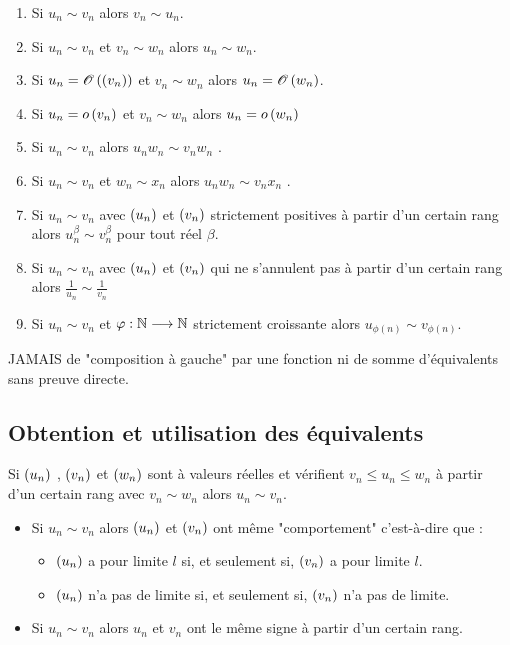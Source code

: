 \begin{defprop}
    \begin{enumerate}
        \item Si \(u_n \sim v_n\) alors \(v_n \sim u_n\).
        \item Si \(u_n \sim v_n\) et \(v_n \sim w_n\) alors \(u_n \sim w_n\).
        \item Si \(u_n = \mathscr{O}\left(\left(v_n\right)\right)\) et \(v_n \sim w_n\) alors \(u_n = \mathscr{O}\left(w_n\right)\).
        \item Si \(u_n = o\left(v_n\right)\) et \(v_n \sim w_n\) alors \(u_n = o\left(w_n\right)\)
        \item Si \(u_n \sim v_n\) alors \(u_nw_n \sim v_nw_n\) .
        \item Si \(u_n \sim v_n\) et \(w_n \sim x_n\) alors \(u_nw_n \sim v_nx_n\) .
        \item Si \(u_n \sim v_n\) avec \(\left(u_n\right)\) et \(\left(v_n\right)\) strictement positives à partir d’un certain rang alors \(u^{\beta}_n \sim v^{\beta}_n\) pour tout réel \(\beta\).
        \item Si \(u_n \sim v_n\) avec \(\left(u_n\right)\) et \(\left(v_n\right)\) qui ne s’annulent pas à partir d’un certain rang alors \(\frac{1}{u_n}\sim \frac{1}{v_n}\)
        \item Si \(u_n \sim v_n\) et \(\varphi : \mathbb{N} \longrightarrow \mathbb{N}\) strictement croissante alors \(u_{\phi(n)} \sim v_{\phi(n)}\).
    \end{enumerate}
    JAMAIS de "composition à gauche" par une fonction ni de somme d’équivalents sans preuve directe.
\end{defprop}

\subsection{Obtention et utilisation des équivalents}
\begin{defprop}

    Si \(\left(u_n\right)\) , \(\left(v_n\right)\) et \(\left(w_n\right)\) sont à valeurs réelles et vérifient \(v_n \leq u_n \leq w_n\) à partir d’un certain rang avec \(v_n \sim w_n\) alors \(u_n \sim v_n\).
\end{defprop}
\begin{defprop}
    \begin{itemize}
        \item Si \(u_n \sim v_n\) alors \(\left(u_n\right)\) et \(\left(v_n\right)\) ont même "comportement" c’est-à-dire que :
        \begin{itemize}
            \item \(\left(u_n\right)\) a pour limite \(l\) si, et seulement si, \(\left(v_n\right)\) a pour limite \(l\).
            \item \(\left(u_n\right)\) n’a pas de limite si, et seulement si, \(\left(v_n\right)\) n’a pas de limite.
        \end{itemize}
        \item Si \(u_n \sim v_n\) alors \(u_n\) et \(v_n\) ont le même signe à partir d’un certain rang.
    \end{itemize}
\end{defprop}
